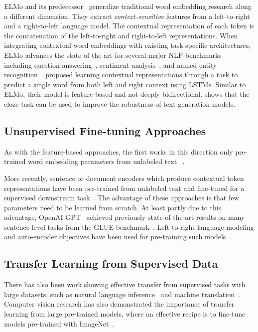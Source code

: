 \documentclass[11pt,a4paper]{article}
\begin{document}
ELMo and its predecessor~\cite{peters-etal:2017:_semi, peters-etal:2018:_deep} generalize traditional word embedding research along a different dimension. They extract \emph{context-sensitive} features from a left-to-right and a right-to-left language model. The contextual representation of each token is the concatenation of the left-to-right and right-to-left representations. When integrating contextual word embeddings with existing task-specific architectures, ELMo advances the state of the art for several major NLP benchmarks~\cite{peters-etal:2018:_deep} including question answering~\cite{rajpurkar-etal:2016:_squad}, sentiment analysis~\cite{socher-etal:2013:_recur}, and named entity recognition~\cite{tjong-de:2003}.
\citet{melamud2016context2vec} proposed learning contextual representations through a task to predict a single word from both left and right context
using LSTMs. Similar to ELMo, their model is feature-based and not deeply bidirectional. 
\citet{fedus2018maskgan} shows that the cloze task can be used to improve the robustness of text generation models. 

\subsection{Unsupervised Fine-tuning Approaches}

As with the feature-based approaches, the first works in this direction only pre-trained word embedding parameters from unlabeled text ~\cite{collobert-weston:2008}.  

More recently, sentence or document encoders which produce contextual token representations have been pre-trained from unlabeled text and fine-tuned for a supervised downstream task~\cite{dai-le:2015:_semi, howard-ruder:2018, radford-etal:2018}.  The advantage of these approaches is that few parameters need to be learned from scratch. At least partly due to this advantage, OpenAI GPT~\cite{radford-etal:2018} achieved previously state-of-the-art results on many sentence-level tasks from the GLUE benchmark~\cite{wang-etal:2018:_glue}.  Left-to-right language modeling and auto-encoder objectives have been used for pre-training such models~\cite{howard-ruder:2018, radford-etal:2018,dai-le:2015:_semi}.

\subsection{Transfer Learning from Supervised Data}

There has also been work showing effective transfer from supervised tasks with large datasets, such as natural language inference~\cite{conneau-EtAl:2017:EMNLP2017} and machine translation~\cite{mccann-etal:2017:_learn_trans}. 
Computer vision research has also demonstrated the importance of transfer learning from large pre-trained models, where an effective recipe is to fine-tune models pre-trained with ImageNet~\cite{imagenet_cvpr09, yosinski2014transferable}. 
\end{document}
